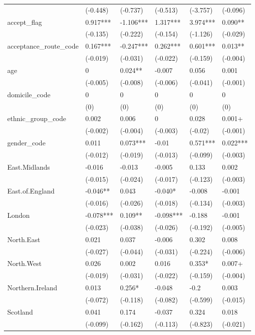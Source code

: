 \begin{longtable}{llllll}
 & (-0.448) & (-0.737) & (-0.513) & (-3.757) & (-0.096) \\
accept\_flag & 0.917*** & -1.106*** & 1.317*** & 3.974*** & 0.090** \\
 & (-0.135) & (-0.222) & (-0.154) & (-1.126) & (-0.029) \\
acceptance\_route\_code & 0.167*** & -0.247*** & 0.262*** & 0.601*** & 0.013** \\
 & (-0.019) & (-0.031) & (-0.022) & (-0.159) & (-0.004) \\
age & 0 & 0.024** & -0.007 & 0.056 & 0.001 \\
 & (-0.005) & (-0.008) & (-0.006) & (-0.041) & (-0.001) \\
domicile\_code & 0 & 0 & 0 & 0 & 0 \\
 & (0) & (0) & (0) & (0) & (0) \\
ethnic\_group\_code & 0.002 & 0.006 & 0 & 0.028 & 0.001+ \\
 & (-0.002) & (-0.004) & (-0.003) & (-0.02) & (-0.001) \\
gender\_code & 0.011 & 0.073*** & -0.01 & 0.571*** & 0.022*** \\
 & (-0.012) & (-0.019) & (-0.013) & (-0.099) & (-0.003) \\
East.Midlands & -0.016 & -0.013 & -0.005 & 0.133 & 0.002 \\
 & (-0.015) & (-0.024) & (-0.017) & (-0.123) & (-0.003) \\
East.of.England & -0.046** & 0.043 & -0.040* & -0.008 & -0.001 \\
 & (-0.016) & (-0.026) & (-0.018) & (-0.134) & (-0.003) \\
London & -0.078*** & 0.109** & -0.098*** & -0.188 & -0.001 \\
 & (-0.023) & (-0.038) & (-0.026) & (-0.192) & (-0.005) \\
North.East & 0.021 & 0.037 & -0.006 & 0.302 & 0.008 \\
 & (-0.027) & (-0.044) & (-0.031) & (-0.224) & (-0.006) \\
North.West & 0.026 & 0.002 & 0.016 & 0.353* & 0.007+ \\
 & (-0.019) & (-0.031) & (-0.022) & (-0.159) & (-0.004) \\
Northern.Ireland & 0.013 & 0.256* & -0.048 & -0.2 & 0.003 \\
 & (-0.072) & (-0.118) & (-0.082) & (-0.599) & (-0.015) \\
Scotland & 0.041 & 0.174 & -0.037 & 0.324 & 0.018 \\
 & (-0.099) & (-0.162) & (-0.113) & (-0.823) & (-0.021) \\

\end{longtable}
